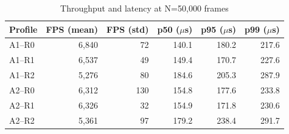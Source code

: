 \begin{table}[htbp]
\centering
\caption{Throughput and latency at N=50,000 frames}
\label{tab:throughput}
\begin{tabular}{l r r r r r}
\toprule
Profile & FPS (mean) & FPS (std) & p50 ($\mu$s) & p95 ($\mu$s) & p99 ($\mu$s) \\
\midrule
  A1--R0 & 6,840 & 72 & 140.1 & 180.2 & 217.6 \\
  A1--R1 & 6,537 & 49 & 149.4 & 170.7 & 227.6 \\
  A1--R2 & 5,276 & 80 & 184.6 & 205.3 & 287.9 \\
  A2--R0 & 6,312 & 130 & 154.8 & 177.6 & 233.8 \\
  A2--R1 & 6,326 & 32 & 154.9 & 171.8 & 230.6 \\
  A2--R2 & 5,361 & 97 & 179.2 & 238.4 & 291.7 \\
\bottomrule
\end{tabular}
\end{table}